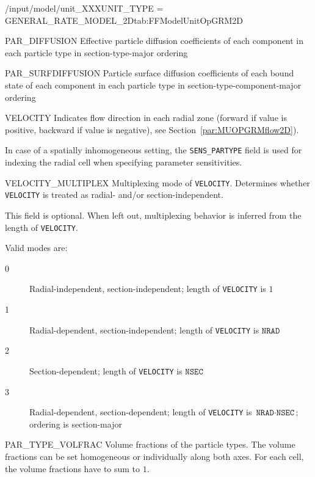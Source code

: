 \begin{condsubgroup}{/input/model/unit\_XXX}{UNIT\_TYPE = GENERAL\_RATE\_MODEL\_2D}{tab:FFModelUnitOpGRM2D}
\begin{dataset}[unit=\si{\square\metre\of{MP}\per\second},type=double,range={$\geq 0$},length={$\texttt{NPARTYPE} \cdot \texttt{NCOMP}$ / $\texttt{NSEC} \cdot \texttt{NPARTYPE} \cdot \texttt{NCOMP}$}]{PAR\_DIFFUSION}
    Effective particle diffusion coefficients of each component in each particle type in section-type-major ordering
  \end{dataset}
  \begin{dataset}[unit=\si{\square\metre\of{SP}\per\second},type=double,range={$\geq 0$},length={$\texttt{NTOTALBND}$ / $\texttt{NSEC} \cdot \texttt{NTOTALBND}$}]{PAR\_SURFDIFFUSION}
    Particle surface diffusion coefficients of each bound state of each component in each particle type in section-type-component-major ordering
  \end{dataset}
  \begin{dataset}[unit=--,type=double,range={$\mathds{R}$},length={see \texttt{VELOCITY\_MULTIPLEX}}]{VELOCITY}
    Indicates flow direction in each radial zone (forward if value is positive, backward if value is negative), see Section~\ref{par:MUOPGRMflow2D}).

    In case of a spatially inhomogeneous setting, the \texttt{SENS\_PARTYPE} field is used for indexing the radial cell when specifying parameter sensitivities.
  \end{dataset}
  \begin{dataset}[unit=--,type=int,range={$\{0, \dots, 3 \}$},length={1}]{VELOCITY\_MULTIPLEX}
    Multiplexing mode of \texttt{VELOCITY}.
    Determines whether \texttt{VELOCITY} is treated as radial- and/or section-independent.

    This field is optional.
    When left out, multiplexing behavior is inferred from the length of \texttt{VELOCITY}.

    Valid modes are:
    \begin{description}
      \item[0] Radial-independent, section-independent; length of \texttt{VELOCITY} is $1$
      \item[1] Radial-dependent, section-independent; length of \texttt{VELOCITY} is $\texttt{NRAD}$
      \item[2] Section-dependent; length of \texttt{VELOCITY} is $\texttt{NSEC}$
      \item[3] Radial-dependent, section-dependent; length of \texttt{VELOCITY} is $\texttt{NRAD} \cdot \texttt{NSEC}$; ordering is section-major
    \end{description}\vspace{-\baselineskip}
  \end{dataset}
  \begin{dataset}[unit=--,type=double,range={$[0,1]$},length={see \texttt{PAR\_TYPE\_VOLFRAC\_MULTIPLEX}}]{PAR\_TYPE\_VOLFRAC}
    Volume fractions of the particle types.
    The volume fractions can be set homogeneous or individually along both axes.
    For each cell, the volume fractions have to sum to $1$.


\end{dataset}
\end{condsubgroup}
